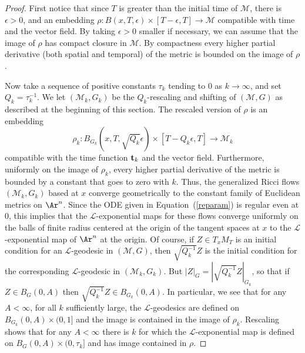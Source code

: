 \begin{proof}
First notice that since $T$ is greater than the initial time of ${\mathcal M}$,
there is $\epsilon>0$, and an embedding $\rho\colon B(x,T,\epsilon)\times
[T-\epsilon,T]\to {\mathcal M}$ compatible with time  and the vector field. By
taking $\epsilon>0$ smaller if necessary, we can assume that the image of
$\rho$ has compact closure in ${\mathcal M}$. By compactness every higher
partial derivative (both spatial and temporal) of the metric is bounded on the
image of $\rho$.

Now take a sequence of positive constants $\tau_k$ tending to $0$ as
$k\rightarrow\infty$, and set $Q_k=\tau_k^{-1}$. We let $({\mathcal
M}_k,G_k)$ be the $Q_k$-rescaling and shifting of $({\mathcal M},G)$
as described at the beginning of this section. The rescaled version
of $\rho$ is an embedding
$$\rho_k\colon B_{G_k}(x,T,\sqrt{Q_k}\epsilon)\times [T-Q_k\epsilon,T]\to
{\mathcal M}_k$$ compatible with the time function ${\bf t}_k$ and the vector
field. Furthermore, uniformly on the image of $\rho_k$, every higher partial
derivative of the metric is bounded by a constant that goes to zero with $k$.
Thus, the generalized Ricci flows $({\mathcal M}_k,G_k)$ based at $x$ converge
geometrically to the constant family of Euclidean metrics on $\Ar^n$. Since the
ODE given in Equation~(\ref{reparam}) is regular even at $0$, this implies that
the ${\mathcal L}$-exponential maps for these flows converge uniformly on the
balls of finite radius centered at the origin of the tangent spaces at $x$ to
the ${\mathcal L}$-exponential map of $\Ar^n$ at the origin. Of course, if
$Z\in T_xM_T$ is an initial condition for an ${\mathcal L}$-geodesic in
$({\mathcal M},G)$, then $\sqrt{Q_k^{-1}}Z$ is the initial condition for the
corresponding ${\mathcal L}$-geodesic in $({\mathcal M}_k,G_k)$. But
$|Z|_G=|\sqrt{Q_k^{-1}}Z|_{G_k}$, so that if $Z\in B_G(0,A)$ then
$\sqrt{Q_k^{-1}}Z\in B_{G_k}(0,A)$.
 In particular, we see
that for any $A<\infty$, for all $k$ sufficiently large, the
${\mathcal L}$-geodesics are defined on $B_{G_k}(0,A)\times (0,1]$
and the image is contained in the image of $\rho_k$. Rescaling shows
that for any $A<\infty$  there is $k$ for which the ${\mathcal
L}$-exponential map is defined on $B_G(0,A)\times (0,\tau_k]$ and
has image contained in $\rho$.


\end{proof}
